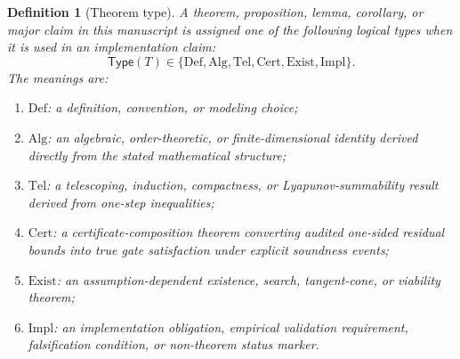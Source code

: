 \documentclass[11pt]{article}
\newtheorem{definition}[theorem]{Definition}
\newcommand{\1}{\mathbf{1}}
\begin{document}
\begin{definition}[Theorem type]
A theorem, proposition, lemma, corollary, or major claim in this manuscript is assigned one of the following logical types when it is used in an implementation claim:
\[
\mathsf{Type}(T)\in
\{\mathrm{Def},\mathrm{Alg},\mathrm{Tel},\mathrm{Cert},\mathrm{Exist},\mathrm{Impl}\}.
\]
The meanings are:
\begin{enumerate}[label=(\alph*)]
    \item \(\mathrm{Def}\): a definition, convention, or modeling choice;
    \item \(\mathrm{Alg}\): an algebraic, order-theoretic, or finite-dimensional identity derived directly from the stated mathematical structure;
    \item \(\mathrm{Tel}\): a telescoping, induction, compactness, or Lyapunov-summability result derived from one-step inequalities;
    \item \(\mathrm{Cert}\): a certificate-composition theorem converting audited one-sided residual bounds into true gate satisfaction under explicit soundness events;
    \item \(\mathrm{Exist}\): an assumption-dependent existence, search, tangent-cone, or viability theorem;
    \item \(\mathrm{Impl}\): an implementation obligation, empirical validation requirement, falsification condition, or non-theorem status marker.
\end{enumerate}
\end{definition}
\end{document}
